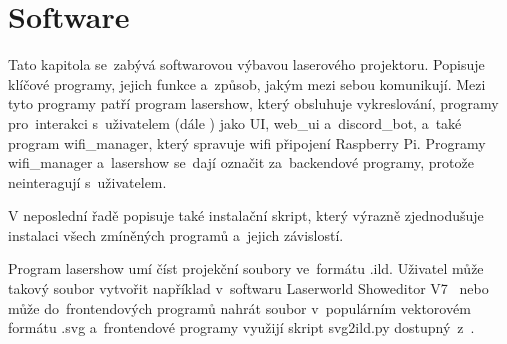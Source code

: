\chapter{Software}

Tato kapitola se~zabývá softwarovou výbavou laserového projektoru. Popisuje klíčové programy, jejich funkce a~způsob, jakým mezi sebou komunikují.
Mezi tyto programy patří program lasershow, který obsluhuje vykreslování, programy  pro~interakci s~uživatelem (dále ) jako UI, web\_ui a~discord\_bot, a~také program wifi\_manager, který spravuje wifi připojení Raspberry Pi.
Programy wifi\_manager  a~lasershow se~dají označit za~backendové programy, protože neinteragují  s~uživatelem.

V neposlední řadě popisuje také instalační skript, který výrazně zjednodušuje instalaci všech zmíněných programů a~jejich závislostí.

Program lasershow umí číst projekční soubory ve~formátu .ild.
Uživatel může takový soubor vytvořit například  v~softwaru Laserworld Showeditor V7~\cite{showeditor} nebo může do~frontendových programů nahrát soubor  v~populárním vektorovém formátu .svg  a~frontendové programy využijí skript svg2ild.py dostupný~z~\cite{svg2ild}.




